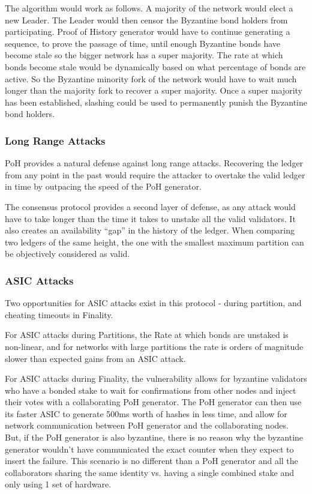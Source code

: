 \documentclass[12pt]{article}
\begin{document}
The algorithm would work as follows. A majority of the network would elect a new Leader. The Leader would then censor the Byzantine bond holders from participating. Proof of History generator would have to continue generating a sequence, to prove the passage of time, until enough Byzantine bonds have become stale so the bigger network has a super majority. The rate at which bonds become stale would be dynamically based on what percentage of bonds are active. So the Byzantine minority fork of the network would have to wait much longer than the majority fork to recover a super majority. Once a super majority has been established, slashing could be used to permanently punish the Byzantine bond holders.

\subsubsection{Long Range Attacks}\label{censorship}
PoH provides a natural defense against long range attacks. Recovering the ledger from any point in the past would require the attacker to overtake the valid ledger in time by outpacing the speed of the PoH generator.

The consensus protocol provides a second layer of defense, as any attack would have to take longer than the time it takes to unstake all the valid validators. It also creates an availability “gap” in the history of the ledger. When comparing two ledgers of the same height, the one with the smallest maximum partition can be objectively considered as valid.

\subsubsection{ASIC Attacks}\label{censorship}

Two opportunities for ASIC attacks exist in this protocol - during partition, and cheating timeouts in Finality.

For ASIC attacks during Partitions, the Rate at which bonds are unstaked is non-linear, and for networks with large partitions the rate is orders of magnitude slower than expected gains from an ASIC attack.

For ASIC attacks during Finality, the vulnerability allows for byzantine validators who have a bonded stake to wait for confirmations from other nodes and inject their votes with a collaborating PoH generator. The PoH generator can then use its faster ASIC to generate 500ms worth of hashes in less time, and allow for network communication between PoH generator and the collaborating nodes. But, if the PoH generator is also byzantine, there is no reason why the byzantine generator wouldn’t have communicated the exact counter when they expect to insert the failure. This scenario is no different than a PoH generator and all the collaborators sharing the same identity vs. having a single combined stake and only using 1 set of hardware.
\end{document}
